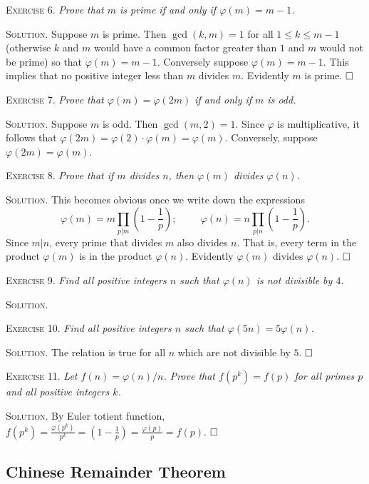 \documentclass[11pt, leqno]{article}
\newcommand{\done}{\ensuremath{\hfill\square}}
\begin{document}
\textsc{Exercise 6}. \emph{Prove that $m$ is prime if and only if $\varphi(m) = m-1$.}

\textsc{Solution}. Suppose $m$ is prime. Then $\gcd(k,m) = 1$ for all $1\leq k \leq m-1$ (otherwise $k$ and $m$ would have a common factor greater than $1$ and $m$ would not be prime) so that $\varphi(m) = m-1$. Conversely suppose $\varphi(m) = m-1$. This implies that no positive integer less than $m$ divides $m$. Evidently $m$ is prime. \done

\textsc{Exercise 7}. \emph{Prove that $\varphi(m) = \varphi(2m)$ if and only if $m$ is odd.}

\textsc{Solution}. Suppose $m$ is odd. Then $\gcd(m, 2)=1$. Since $\varphi$ is multiplicative, it follows that $\varphi(2m) = \varphi(2)\cdot \varphi(m) = \varphi(m)$. Conversely, suppose $\varphi(2m) = \varphi(m)$.

\textsc{Exercise 8}. \emph{Prove that if $m$ divides $n$, then $\varphi(m)$ divides $\varphi(n)$.}

\textsc{Solution}. This becomes obvious once we write down the expressions
\begin{displaymath}
\varphi(m) = m \prod_{p|m} \left(1-\frac{1}{p}\right); \hspace{1cm} \varphi(n) = n \prod_{p|n} \left(1-\frac{1}{p}\right).
\end{displaymath}
Since $m|n$, every prime that divides $m$ also divides $n$. That is, every term in the product $\varphi(m)$ is in the product $\varphi(n)$. Evidently $\varphi(m)$ divides $\varphi(n)$. \done

\textsc{Exercise 9}. \emph{Find all positive integers $n$ such that $\varphi(n)$ is not divisible by $4$.}

\textsc{Solution}.

\textsc{Exercise 10}. \emph{Find all positive integers $n$ such that $\varphi(5n) = 5\varphi(n)$.}

\textsc{Solution}. The relation is true for all $n$ which are not divisible by $5$. \done

\textsc{Exercise 11}. \emph{Let $f(n) = \varphi(n)/n$. Prove that $f(p^k) = f(p)$ for all primes $p$ and all positive integers $k$.}

\textsc{Solution}. By Euler totient function, $\displaystyle f(p^k) = \frac{\varphi(p^k)}{p^k} = \left(1 - \frac{1}{p}\right) = \frac{\varphi(p)}{p} = f(p)$. \done

\subsection{Chinese Remainder Theorem}
\end{document}
